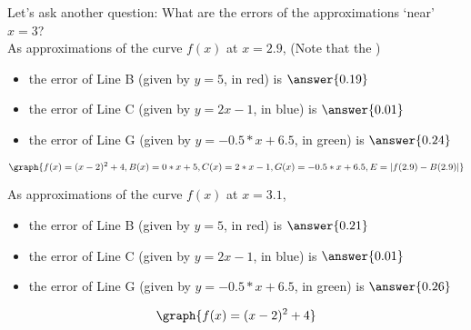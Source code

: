 \documentclass[handout,nooutcomes]{ximera}
\begin{document}

Let's ask another question: What are the errors of the approximations `near' $x=3$? \\

As approximations of the curve $f(x)$ at {\bf $x=2.9$}, (Note that the )
\begin{itemize}
\item the error of Line B (given by $y=5$, in red) is $\answer{0.19}$
\item the error of Line C (given by $y=2x-1$, in blue) is $\answer{0.01}$
\item the error of Line G (given by $y=-0.5*x + 6.5$, in green) is $\answer{0.24}$
\end{itemize}

\[
\graph{f(x) = (x-2)^2 + 4, B(x) = 0*x + 5, C(x) = 2*x -1, G(x) = -0.5*x + 6.5, E = |f(2.9) - B(2.9)|}
\]

As approximations of the curve $f(x)$ at {\bf $x=3.1$},\\
\begin{itemize}
\item the error of Line B (given by $y=5$, in red) is $\answer{0.21}$\\
\item the error of Line C (given by $y=2x-1$, in blue) is $\answer{0.01}$\\
\item the error of Line G (given by $y=-0.5*x + 6.5$, in green) is $\answer{0.26}$\\
\end{itemize}
\[
\graph{f(x) = (x-2)^2 + 4}
\]
\end{document}
